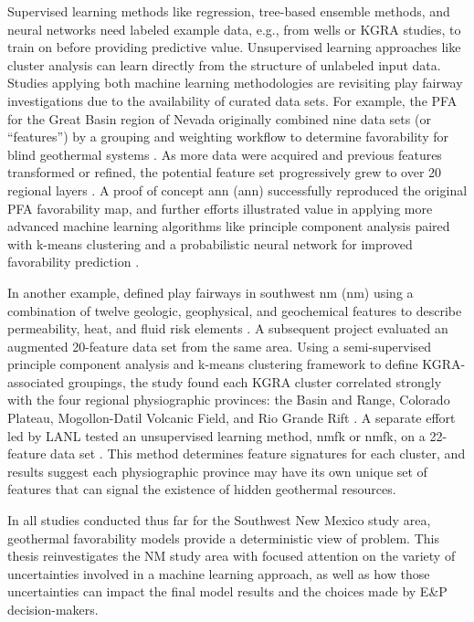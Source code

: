 Supervised learning methods like regression, tree-based ensemble methods, and neural networks need labeled example data, e.g., from wells or KGRA studies, to train on before providing predictive value. Unsupervised learning approaches like cluster analysis can learn directly from the structure of unlabeled input data. Studies applying both machine learning methodologies are revisiting play fairway investigations due to the availability of curated data sets. For example, the PFA for the Great Basin region of Nevada originally combined nine data sets (or “features”) by a grouping and weighting workflow to determine favorability for blind geothermal systems \citep{faulds_progress_2017}. As more data were acquired and previous features transformed or refined, the potential feature set progressively grew to over 20 regional layers \citep{brown_machine_2020, faulds_discovering_2019}. A proof of concept \acrlong{ann} (\acrshort{ann}) successfully reproduced the original PFA favorability map, and further efforts illustrated value in applying more advanced machine learning algorithms like principle component analysis paired with k-means clustering \citep{smith_characterizing_2021} and a probabilistic neural network for improved favorability prediction \citep{brown_machine_2020}.

In another example, \citeauthor{bielicki_hydrogeolgic_2015} defined play fairways in southwest \acrlong{nm} (\acrshort{nm}) using a combination of twelve geologic, geophysical, and geochemical features to describe permeability, heat, and fluid risk elements \citeyear{bielicki_hydrogeolgic_2015}. A subsequent project evaluated an augmented 20-feature data set from the same area. Using a semi-supervised principle component analysis and k-means clustering framework to define KGRA-associated groupings, the study found each KGRA cluster correlated strongly with the four regional physiographic provinces: the Basin and Range, Colorado Plateau, Mogollon-Datil Volcanic Field, and Rio Grande Rift \citep{pepin_new_2018}. A separate effort led by LANL tested an unsupervised learning method, \acrlong{nmfk} or \acrshort{nmfk}, on a 22-feature data set \citep{vesselinov_discovering_2020}. This method determines feature signatures for each cluster, and results suggest each physiographic province may have its own unique set of features that can signal the existence of hidden geothermal resources. 

In all studies conducted thus far for the Southwest New Mexico study area, geothermal favorability models provide a deterministic view of problem. This thesis reinvestigates the NM study area with focused attention on the variety of uncertainties involved in a machine learning approach, as well as how those uncertainties can impact the final model results and the choices made by E\&P decision-makers.

